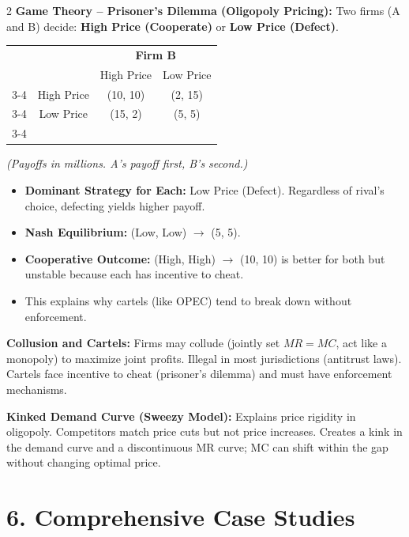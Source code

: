\documentclass[10pt,a4paper]{article}
\begin{document}
\begin{multicols}{2}
\textbf{Game Theory -- Prisoner's Dilemma (Oligopoly Pricing):}
Two firms (A and B) decide: \textbf{High Price (Cooperate)} or \textbf{Low Price (Defect)}.
\begin{center}
\begin{tabular}{cc|c|c|}
\multicolumn{2}{c}{} & \multicolumn{2}{c}{\textbf{Firm B}} \\
\multicolumn{2}{c}{} & High Price & Low Price \\
\cline{3-4}
\multirow{2}{*}{\textbf{Firm A}} & High Price & (10, 10) & (2, 15) \\
\cline{3-4}
& Low Price & (15, 2) & (5, 5) \\
\cline{3-4}
\end{tabular}
\end{center}
\textit{(Payoffs in millions. A's payoff first, B's second.)}
\begin{itemize}[nosep]
    \item \textbf{Dominant Strategy for Each:} Low Price (Defect). Regardless of rival's choice, defecting yields higher payoff.
    \item \textbf{Nash Equilibrium:} (Low, Low) $\to$ (5, 5).
    \item \textbf{Cooperative Outcome:} (High, High) $\to$ (10, 10) is better for both but unstable because each has incentive to cheat.
    \item This explains why cartels (like OPEC) tend to break down without enforcement.
\end{itemize}

\textbf{Collusion and Cartels:} Firms may collude (jointly set $MR = MC$, act like a monopoly) to maximize joint profits. Illegal in most jurisdictions (antitrust laws). Cartels face incentive to cheat (prisoner's dilemma) and must have enforcement mechanisms.

\textbf{Kinked Demand Curve (Sweezy Model):} Explains price rigidity in oligopoly. Competitors match price cuts but not price increases. Creates a kink in the demand curve and a discontinuous MR curve; MC can shift within the gap without changing optimal price.

\section*{6. Comprehensive Case Studies}


\end{multicols}
\end{document}

